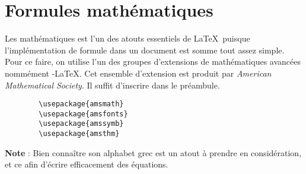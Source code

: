 	\section{Formules mathématiques}
	Les mathématiques est l'un des atouts essentiels de \LaTeX~puisque l'implémentation de formule dans un document est somme tout assez simple. Pour ce faire, on utilise l'un des groupes d'extensions de mathématiques avancées nommément \AmS-\LaTeX. Cet ensemble d'extension est produit par \emph{American Mathematical Society}. Il suffit d'inscrire dans le préambule.
%
	\begin{verbatim}
		\usepackage{amsmath}
		\usepackage{amsfonts}
		\usepackage{amssymb}
		\usepackage{amsthm}
	\end{verbatim}
%
	\textbf{Note} : Bien connaître son alphabet grec est un atout à prendre en considération, et ce afin d'écrire efficacement des équations.%
%	
